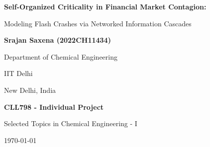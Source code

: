 \documentclass[final,5p,times,twocolumn,authoryear]{elsarticle}
\begin{document}
\onecolumn
\begin{titlepage}
    \centering
    \vspace*{3cm}
    
    {\Huge \bfseries Self-Organized Criticality in Financial Market Contagion:\par}
    \vspace{0.75cm}
    {\LARGE Modeling Flash Crashes via Networked Information Cascades\par}
    
    \vspace{4cm}
    
    {\Large \bfseries Srajan Saxena (2022CH11434)\par}
    \vspace{0.5cm}
    {\large Department of Chemical Engineering\par}
    {\large IIT Delhi\par}
    {\large New Delhi, India\par}
    
    \vspace{4cm}
    
    {\Large \textbf{CLL798 - Individual Project}\par}
    \vspace{0.5cm}
    {\large Selected Topics in Chemical Engineering - I\par}
    \vspace{1cm}
    {\large \today\par}
    
    \vfill
\end{titlepage}

\newpage
\vspace*{2cm}
\renewcommand{\contentsname}{\begin{center}\Huge\bfseries Index \end{center}\vspace{1cm}}
\tableofcontents
\thispagestyle{empty}
\clearpage
\twocolumn %
\end{document}
